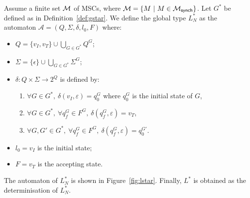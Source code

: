 \begin{definition}\label{def:lstar}
	Assume a finite set $\mathcal{M}$ of MSCs, where
	$\mathcal{M} = \{M\ |\ M \in \mathcal{M}_{\mathsf{synch}}\}$. Let $G^*$
	be defined as in Definition~\ref{def:gstar}.
	We define the global type $L^*_{N}$ as the automaton
	$\mathcal A = (Q,\Sigma, \delta, l_0, F)$ where:
	\begin{itemize}
		\item $Q = \{v_I,v_T\}\cup \bigcup_{G\in G^*} Q^G$;
		\item $\Sigma = \{\epsilon\}\cup\bigcup_{G\in G^*} \Sigma^G$;
		\item $\delta: Q \times \Sigma \rightarrow 2^Q$ is defined by:
			      \begin{enumerate}
				       \item $\forall G \in G^*,\ \delta(v_I, \varepsilon) = q_0^G$ where $q_0^G$ is the initial state of $G$,
				       \item $\forall G \in G^*,\ \forall q_f^G \in F^G,\ \delta(q_f^G, \varepsilon) = v_T$,
				       \item $\forall G, G' \in G^*,\ \forall q_f^G \in F^G,\ \delta(q_f^G, \varepsilon) = q_0^{G'}$.
			      \end{enumerate}
		\item $l_0 = v_I$ is the initial state;
		\item $F = v_T$ is the accepting state.
	\end{itemize}
	The automaton of $L^*_{N}$ is shown in Figure~\ref{fig:lstar}.  
	Finally, $L^*$ is obtained as the determinisation of $L^*_{N}$.
\end{definition}

